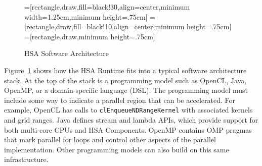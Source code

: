 \documentclass[final]{book}
\begin{document}
\begin{figure}
  \centering
  =[rectangle,draw,fill=black!30,align=center,minimum width=1.25cm,minimum height=.75cm]
  =[rectangle,draw,fill=black!10,align=center,minimum height=.75cm]
  =[rectangle,draw,minimum height=.75cm]
  \caption{HSA Software Architecture}
  \label{fig:swarch}
\end{figure}

Figure~\ref{fig:swarch} shows how the HSA Runtime fits into a typical software
architecture stack. At the top of the stack is a programming model such as
OpenCL\texttrademark, Java, OpenMP, or a domain-specific language (DSL). The
programming model must include some way to indicate a parallel region that can
be accelerated. For example, OpenCL has calls to \texttt{clEnqueueNDRangeKernel}
with associated kernels and grid ranges. Java defines stream and lambda APIs,
which provide support for both multi-core CPUs and HSA Components. OpenMP
contains OMP pragmas that mark parallel for loops and control other aspects of
the parallel implementation. Other programming models can also build on this
same infrastructure.
\end{document}
